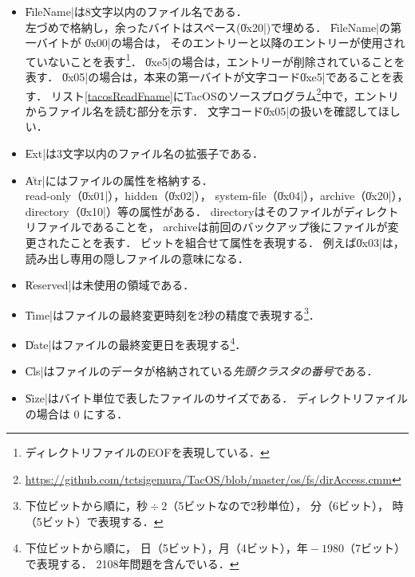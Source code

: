 \begin{itemize}
\item \|FileName|は8文字以内のファイル名である．\\
  左づめで格納し，余ったバイトはスペース(\|0x20|)で埋める．
  \|FileName|の第一バイトが
  \|0x00|の場合は，
  そのエントリーと以降のエントリーが使用されていないことを表す\footnote{
    ディレクトリファイルのEOFを表現している．}．
  \|0xe5|の場合は，エントリーが削除されていることを表す．
  \|0x05|の場合は，本来の第一バイトが文字コード\|0xe5|であることを表す．
  リスト\ref{tacosReadFname}にTacOSのソースプログラム\footnote{
    \url{https://github.com/tctsigemura/TacOS/blob/master/os/fs/dirAccess.cmm}
  }中で，エントリからファイル名を読む部分を示す．
  文字コード\|0x05|の扱いを確認してほしい．

\item \|Ext|は3文字以内のファイル名の拡張子である．

\item \|Atr|にはファイルの属性を格納する．\\
  read-only（\|0x01|），hidden（\|0x02|），
  system-file（\|0x04|），archive（\|0x20|），
  directory（\|0x10|）等の属性がある．
  directoryはそのファイルがディレクトリファイルであることを，
  archiveは前回のバックアップ後にファイルが変更されたことを表す．
  ビットを組合せて属性を表現する．
  例えば\|0x03|は，読み出し専用の隠しファイルの意味になる．

\item \|Reserved|は未使用の領域である．

\item \|Time|はファイルの最終変更時刻を2秒の精度で表現する\footnote{
  下位ビットから順に，$秒 \div 2$（5ビットなので2秒単位），
  分（6ビット），
  時（5ビット）で表現する．}．

\item \|Date|はファイルの最終変更日を表現する\footnote{下位ビットから順に，
  日（5ビット），月（4ビット），$年-1980$（7ビット）で表現する．
  2108年問題を含んでいる．}．

\item \|Cls|はファイルのデータが格納されている\emph{先頭クラスタの番号}である．
  
\item \|Size|はバイト単位で表したファイルのサイズである．
  ディレクトリファイルの場合は 0 にする．
\end{itemize}



